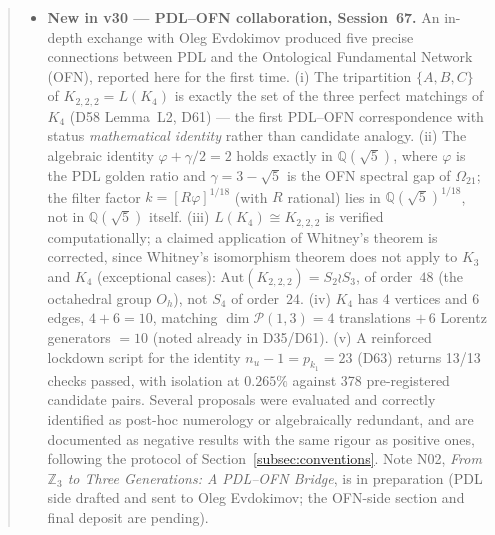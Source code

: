 \documentclass[11pt,a4paper]{article}
\theoremstyle{plain}
\theoremstyle{definition}
\theoremstyle{remark}
\begin{document}
\begin{abstract}
\begin{itemize}
\item \textbf{New in v30 --- PDL--OFN collaboration, Session~67.} An in-depth exchange with Oleg Evdokimov produced five precise connections between PDL and the Ontological Fundamental Network (OFN), reported here for the first time. (i) The tripartition $\{A,B,C\}$ of $K_{2,2,2} = L(K_4)$ is exactly the set of the three perfect matchings of $K_4$ (D58 Lemma~L2, D61) --- the first PDL--OFN correspondence with status \emph{mathematical identity} rather than candidate analogy. (ii) The algebraic identity $\varphi + \gamma/2 = 2$ holds exactly in $\mathbb{Q}(\sqrt{5})$, where $\varphi$ is the PDL golden ratio and $\gamma = 3-\sqrt{5}$ is the OFN spectral gap of $\Omega_{21}$; the filter factor $k = [R\varphi]^{1/18}$ (with $R$ rational) lies in $\mathbb{Q}(\sqrt{5})^{1/18}$, not in $\mathbb{Q}(\sqrt{5})$ itself. (iii) $L(K_4) \cong K_{2,2,2}$ is verified computationally; a claimed application of Whitney's theorem is corrected, since Whitney's isomorphism theorem does not apply to $K_3$ and $K_4$ (exceptional cases): $\mathrm{Aut}(K_{2,2,2}) = S_2\wr S_3$, of order~$48$ (the octahedral group $O_h$), not $S_4$ of order~$24$. (iv) $K_4$ has $4$ vertices and $6$ edges, $4+6=10$, matching $\dim\mathcal{P}(1,3) = 4$ translations $+\,6$ Lorentz generators $=10$ (noted already in D35/D61). (v) A reinforced lockdown script for the identity $n_u-1=p_{k_1}=23$ (D63) returns 13/13 checks passed, with isolation at $0.265\%$ against 378 pre-registered candidate pairs. Several proposals were evaluated and correctly identified as post-hoc numerology or algebraically redundant, and are documented as negative results with the same rigour as positive ones, following the protocol of Section~\ref{subsec:conventions}. Note N02, \emph{From $\mathbb{Z}_3$ to Three Generations: A PDL--OFN Bridge}, is in preparation (PDL side drafted and sent to Oleg Evdokimov; the OFN-side section and final deposit are pending).
\end{itemize}

\end{abstract}
\end{document}

